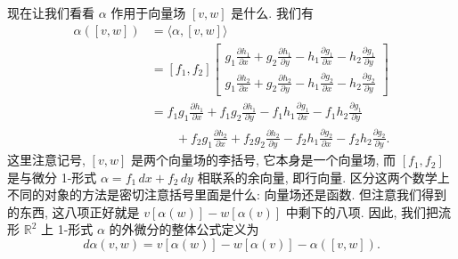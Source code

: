 现在让我们看看 $\alpha$ 作用于向量场 $[v,w]$ 是什么. 我们有
\begin{align*}
\alpha([v,w])&=\bigl\langle\alpha,[v,w]\bigr\rangle\\
&=[f_1,f_2]\begin{bmatrix}
g_1\frac{\partial h_1}{\partial x}+g_2\frac{\partial h_1}{\partial y}-h_1\frac{\partial g_1}{\partial x}-h_2\frac{\partial g_1}{\partial y}\\[4pt]
g_1\frac{\partial h_2}{\partial x}+g_2\frac{\partial h_2}{\partial y}-h_1\frac{\partial g_2}{\partial x}-h_2\frac{\partial g_2}{\partial y}
\end{bmatrix}\\
&=f_1g_1\frac{\partial h_1}{\partial x}+f_1g_2\frac{\partial h_1}{\partial y}
-f_1h_1\frac{\partial g_1}{\partial x}-f_1h_2\frac{\partial g_1}{\partial y}\\
&\qquad+f_2g_1\frac{\partial h_2}{\partial x}+f_2g_2\frac{\partial h_2}{\partial y}
-f_2h_1\frac{\partial g_2}{\partial x}-f_2h_2\frac{\partial g_2}{\partial y}.
\end{align*}
这里注意记号, $[v,w]$ 是两个向量场的李括号, 它本身是一个向量场, 而 $[f_1,f_2]$ 是与微分 1-形式 $\alpha=f_1\,dx+f_2\,dy$ 相联系的余向量, 即行向量. 区分这两个数学上不同的对象的方法是密切注意括号里面是什么: 向量场还是函数. 但注意我们得到的东西, 这八项正好就是 $v[\alpha(w)]-w[\alpha(v)]$ 中剩下的八项. 因此, 我们把流形 $\mathbb{R}^2$ 上 1-形式 $\alpha$ 的外微分的整体公式定义为
\[
d\alpha(v,w)=v[\alpha(w)]-w[\alpha(v)]-\alpha([v,w]).
\]

